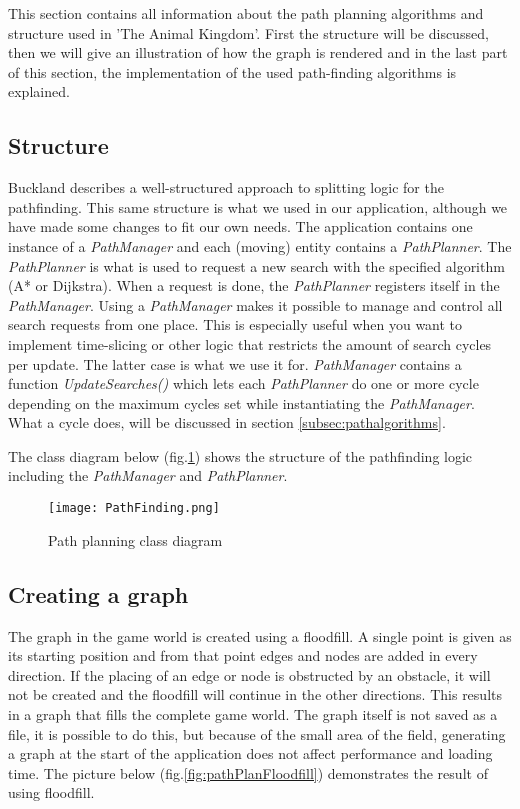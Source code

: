 This section contains all information about the path planning algorithms and structure used in 'The Animal Kingdom'.
First the structure will be discussed, then we will give an illustration of how the graph is rendered and in the last part of this section,
the implementation of the used path-finding algorithms is explained.

\subsection{Structure}\label{subsec:pathstructure}
Buckland describes\cite{pgaie} a well-structured approach to splitting logic for the pathfinding.
This same structure is what we used in our application, although we have made some changes to fit our own needs.
The application contains one instance of a \textit{PathManager} and each (moving) entity contains a \textit{PathPlanner}.
The \textit{PathPlanner} is what is used to request a new search with the specified algorithm (A* or Dijkstra).
When a request is done, the \textit{PathPlanner} registers itself in the \textit{PathManager}.
Using a \textit{PathManager} makes it possible to manage and control all search requests from one place.
This is especially useful when you want to implement time-slicing or other logic that restricts the amount of search cycles per update.
The latter case is what we use it for.
\textit{PathManager} contains a function \textit{UpdateSearches()} which lets each \textit{PathPlanner} do one or more cycle depending on the maximum cycles set while instantiating the \textit{PathManager}.
What a cycle does, will be discussed in section \ref{subsec:pathalgorithms}.\par
The class diagram below (fig.\ref{fig:pathPlanClassDiagram}) shows the structure of the pathfinding logic including the \textit{PathManager} and \textit{PathPlanner}.

\begin{figure}[h!]
    \begin{center}
        \texttt{[image: PathFinding.png]}
    \end{center}
    \caption{Path planning class diagram}
    \label{fig:pathPlanClassDiagram}
\end{figure}

\subsection{Creating a graph}\label{subsec:pathgraphcreation}
The graph in the game world is created using a floodfill.
A single point is given as its starting position and from that point edges and nodes are added in every direction.
If the placing of an edge or node is obstructed by an obstacle, it will not be created and the floodfill will continue
in the other directions.
This results in a graph that fills the complete game world.
The graph itself is not saved as a file, it is possible to do this, but because of the small area of the field,
generating a graph at the start of the application does not affect performance and loading time.
The picture below (fig.\ref{fig:pathPlanFloodfill}) demonstrates the result of using floodfill.

